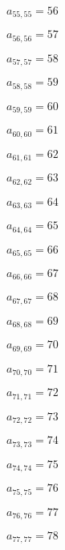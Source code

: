 \documentclass[a4paper,12pt]{article}
\begin{document}
$a _{ 55, 55 } = 56$

$a _{ 56, 56 } = 57$

$a _{ 57, 57 } = 58$

$a _{ 58, 58 } = 59$

$a _{ 59, 59 } = 60$

$a _{ 60, 60 } = 61$

$a _{ 61, 61 } = 62$

$a _{ 62, 62 } = 63$

$a _{ 63, 63 } = 64$

$a _{ 64, 64 } = 65$

$a _{ 65, 65 } = 66$

$a _{ 66, 66 } = 67$

$a _{ 67, 67 } = 68$

$a _{ 68, 68 } = 69$

$a _{ 69, 69 } = 70$

$a _{ 70, 70 } = 71$

$a _{ 71, 71 } = 72$

$a _{ 72, 72 } = 73$

$a _{ 73, 73 } = 74$

$a _{ 74, 74 } = 75$

$a _{ 75, 75 } = 76$

$a _{ 76, 76 } = 77$

$a _{ 77, 77 } = 78$
\end{document}
